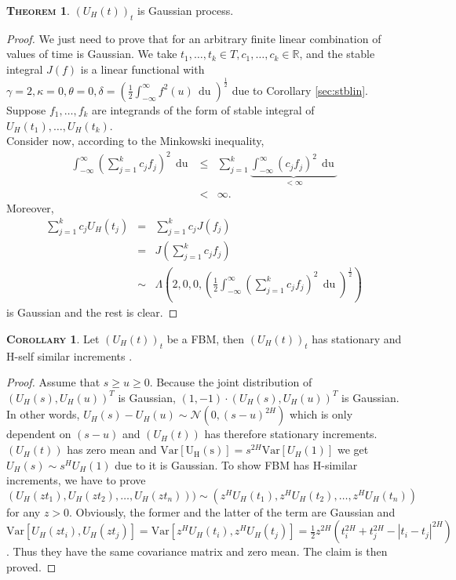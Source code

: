 \documentclass[a4paper, twoside, 11pt]{article}
\theoremstyle{definition}
\newtheorem{theorem}[definition]{\scshape Theorem}
\newtheorem{corollary}[definition]{\scshape Corollary}
\begin{document}
\begin{theorem}
  $(U_H(t))_{t}$ is Gaussian process.
\end{theorem}

\begin{proof}
  We just need to prove that for an arbitrary finite linear combination of values of time is Gaussian. We take $t_1, \dots, t_k \in T, c_1, \dots, c_k \in \mathbb{R}$, and the stable integral $J(f) $ is a linear functional with $\gamma=2, \kappa=0, \theta=0, \delta= (\frac{1}{2}\int_{-\infty}^{\infty}f^2(u)\,\mathop{du})^{\frac{1}{2}}$ due to Corollary \ref{sec:stblin}. Suppose $f_1,\dots, f_k$ are integrands of the form of stable integral of $U_H(t_1), \dots, U_H(t_k)$. \\
  Consider now, according to the Minkowski inequality,
  \begin{eqnarray*}
	\int_{-\infty}^{\infty}(\sum_{j=1}^k c_jf_j)^2\,\mathop{du} &\le& \sum_{j=1}^k \underbrace{\int_{-\infty}^{\infty}(c_jf_j)^2\,\mathop{du}}_{<\infty}\\
	&<& \infty.
  \end{eqnarray*}
Moreover,
  \begin{eqnarray*}
	\sum_{j=1}^k c_jU_H(t_j) &=& \sum_{j=1}^k c_jJ(f_j)\\
	&=& J(\sum_{j=1}^k c_jf_j)\\
	&\sim& \Lambda(2, 0, 0, (\frac{1}{2}\int_{-\infty}^{\infty}(\sum_{j=1}^k c_jf_j)^2\,\mathop{du})^{\frac{1}{2}})
  \end{eqnarray*}
  is Gaussian and the rest is clear.
\end{proof}

\begin{corollary}
  Let $(U_H(t))_{t}$ be a FBM, then $(U_H(t))_{t}$ has stationary and H-self similar increments . 
\end{corollary}
\begin{proof}
 Assume that $s \ge u \ge 0 $. Because the joint distribution of $(U_H(s), U_H(u))^T$ is Gaussian, $(1, -1) \cdot (U_H(s), U_H(u))^T $ is Gaussian. In other words,  $U_H(s) - U_H(u) \sim \mathcal{N}(0, (s-u)^{2H})$ which is only dependent on $(s-u)$ and $(U_H(t))$ has therefore stationary increments.\\
   $(U_H(t))$ has zero mean and $\mathrm{Var[U_H(s)]} = s^{2H}\mathrm{Var}[U_H(1)]$ we get $U_H(s) \sim s^HU_H(1)$ due to it is Gaussian.
   To show FBM has H-similar increments, we have to prove\\ $(U_H(zt_1), U_H(zt_2),\dots, U_H(zt_n))) \sim (z^HU_H(t_1), z^HU_H(t_2),\dots, z^HU_H(t_n))$ for any $z > 0$. Obviously, the former and the latter of the term are Gaussian and $\mathrm{Var}[U_H(zt_i), U_H(zt_j)] = \mathrm{Var}[z^HU_H(t_i), z^HU_H(t_j)] = \frac{1}{2}z^{2H}(t_i^{2H} + t_j^{2H} - |t_i-t_j|^{2H})$. Thus they have the same covariance matrix and zero mean. The claim is then proved.
\end{proof}
\end{document}
